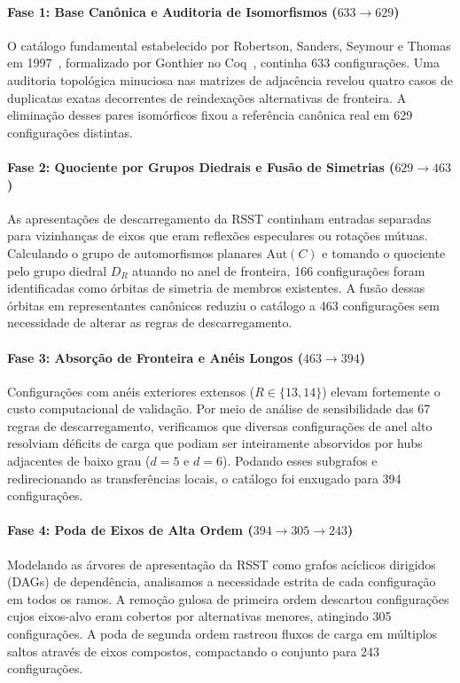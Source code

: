 \documentclass[11pt,a4paper]{article}
\theoremstyle{plain}
\theoremstyle{definition}
\begin{document}
\paragraph{Fase 1: Base Canônica e Auditoria de Isomorfismos ($633 \to 629$)}
O catálogo fundamental estabelecido por Robertson, Sanders, Seymour e Thomas em 1997~\cite{robertson1997four}, formalizado por Gonthier no Coq~\cite{gonthier2008formal}, continha 633 configurações. Uma auditoria topológica minuciosa nas matrizes de adjacência revelou quatro casos de duplicatas exatas decorrentes de reindexações alternativas de fronteira. A eliminação desses pares isomórficos fixou a referência canônica real em 629 configurações distintas.

\paragraph{Fase 2: Quociente por Grupos Diedrais e Fusão de Simetrias ($629 \to 463$)}
As apresentações de descarregamento da RSST continham entradas separadas para vizinhanças de eixos que eram reflexões especulares ou rotações mútuas. Calculando o grupo de automorfismos planares $\text{Aut}(C)$ e tomando o quociente pelo grupo diedral $D_R$ atuando no anel de fronteira, 166 configurações foram identificadas como órbitas de simetria de membros existentes. A fusão dessas órbitas em representantes canônicos reduziu o catálogo a 463 configurações sem necessidade de alterar as regras de descarregamento.

\paragraph{Fase 3: Absorção de Fronteira e Anéis Longos ($463 \to 394$)}
Configurações com anéis exteriores extensos ($R \in \{13, 14\}$) elevam fortemente o custo computacional de validação. Por meio de análise de sensibilidade das 67 regras de descarregamento, verificamos que diversas configurações de anel alto resolviam déficits de carga que podiam ser inteiramente absorvidos por hubs adjacentes de baixo grau ($d=5$ e $d=6$). Podando esses subgrafos e redirecionando as transferências locais, o catálogo foi enxugado para 394 configurações.

\paragraph{Fase 4: Poda de Eixos de Alta Ordem ($394 \to 305 \to 243$)}
Modelando as árvores de apresentação da RSST como grafos acíclicos dirigidos (DAGs) de dependência, analisamos a necessidade estrita de cada configuração em todos os ramos. A remoção gulosa de primeira ordem descartou configurações cujos eixos-alvo eram cobertos por alternativas menores, atingindo 305 configurações. A poda de segunda ordem rastreou fluxos de carga em múltiplos saltos através de eixos compostos, compactando o conjunto para 243 configurações.
\end{document}
